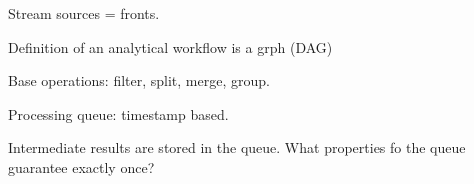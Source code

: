 
\label {fs-model-section}


Stream sources = fronts. 

Definition of an analytical workflow is a grph (DAG)

Base operations: filter, split, merge, group. 

Processing queue: timestamp based. 

Intermediate results are stored in the queue. What properties fo the queue guarantee exactly once?


